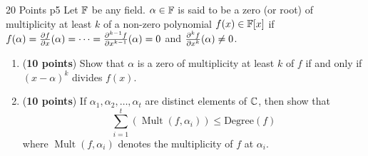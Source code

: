 \documentclass[a4paper, 11pt]{article}
\DeclareMathOperator{\mult}{Mult}
\begin{document}
\begin{problem}{%
\hfill 20 Points	}{p5%
	}
Let $\mathbb{F}$ be any field. $\alpha\in\mathbb{F}$ is said to be a zero (or root) of multiplicity at least $k$ of a non-zero polynomial $f(x)\in\mathbb{F}[x]$ if $f(\alpha)=\frac{\partial f}{\partial x}(\alpha)=\cdots=\frac{\partial ^{k-1}f}{\partial x^{k-1}}(\alpha)=0$ and $\frac{\partial ^kf}{\partial x^k}(\alpha)\neq 0$.\begin{enumerate}[label=(\alph*)]
	\item (\textbf{10 points}) Show that $\alpha$ is a zero of multiplicity at least $k$ of $f$ if and only if $(x-\alpha)^k$ divides $f(x)$.
	\item(\textbf{10 points}) If $\alpha_1,\alpha_2,\dots,\alpha_t$ are distinct elements of $\mathbb{C}$, then show that $$\sum\limits_{i=1}^t(\mult(f,\alpha_i))\leq \text{Degree}(f)$$where $\mult(f,\alpha_i)$ denotes the multiplicity of $f$ at $\alpha_i$.
\end{enumerate}
\end{problem}
\solve{
\begin{enumerate}[label=(\alph*)]
\item 
\end{enumerate}
}
\end{document}
